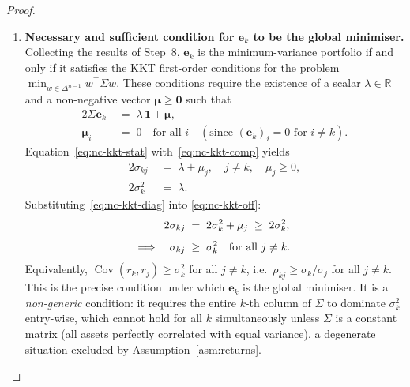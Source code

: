 \documentclass[12pt,openany]{book}
\newcommand{\bfw}{\mathbf{w}}
\newcommand{\bfe}{\mathbf{e}}
\DeclareMathOperator{\Cov}{Cov}
\numberwithin{equation}{chapter}
\theoremstyle{plain}
\theoremstyle{definition}
\theoremstyle{remark}
\def\bfw{w}%
\begin{document}
\begin{proof}
\begin{enumerate}
  \item \textbf{Necessary and sufficient condition for $\bfe_k$
        to be the global minimiser.}
        Collecting the results of Step~8, $\bfe_k$ is the
        minimum-variance portfolio if and only if it satisfies
        the KKT first-order conditions for the problem
        $\min_{\bfw \in \Delta^{n-1}} \bfw^\top\Sigma\bfw$.
        These conditions require the existence of a scalar
        $\lambda \in \mathbb{R}$ and a non-negative vector
        $\boldsymbol{\mu} \geq \mathbf{0}$ such that
        \begin{align}
          2\Sigma\bfe_k &\;=\; \lambda\,\mathbf{1} + \boldsymbol{\mu},
          \label{eq:nc-kkt-stat}\\[4pt]
          \boldsymbol{\mu}_i &\;=\; 0 \quad \text{for all } i
                     \quad (\text{since } (\bfe_k)_i = 0
                     \text{ for } i \neq k).
          \label{eq:nc-kkt-comp}
        \end{align}
        Equation~\eqref{eq:nc-kkt-stat} with~\eqref{eq:nc-kkt-comp}
        yields
        \begin{align}
          2\sigma_{kj} &\;=\; \lambda + \mu_j,
          \quad j \neq k, \quad \mu_j \geq 0,
          \label{eq:nc-kkt-off}\\[4pt]
          2\sigma_k^2  &\;=\; \lambda.
          \label{eq:nc-kkt-diag}
        \end{align}
        Substituting~\eqref{eq:nc-kkt-diag} into
        \eqref{eq:nc-kkt-off}:
        \begin{align}
          2\sigma_{kj}
          &\;=\; 2\sigma_k^2 + \mu_j
           \;\geq\; 2\sigma_k^2,
          \notag\\[4pt]
          \Longrightarrow\quad
          \sigma_{kj} &\;\geq\; \sigma_k^2
          \quad \text{for all } j \neq k.
          \label{eq:nc-kkt-necessary}
        \end{align}
        Equivalently, $\Cov(r_k, r_j) \geq \sigma_k^2$ for all
        $j \neq k$, i.e.\ $\rho_{kj} \geq \sigma_k/\sigma_j$
        for all $j \neq k$.  This is the precise condition under
        which $\bfe_k$ is the global minimiser.  It is a
        \emph{non-generic} condition: it requires the entire
        $k$-th column of $\Sigma$ to dominate $\sigma_k^2$
        entry-wise, which cannot hold for all $k$ simultaneously
        unless $\Sigma$ is a constant matrix (all assets
        perfectly correlated with equal variance), a degenerate
        situation excluded by Assumption~\ref{asm:returns}.


\end{enumerate}
\end{proof}
\end{document}
